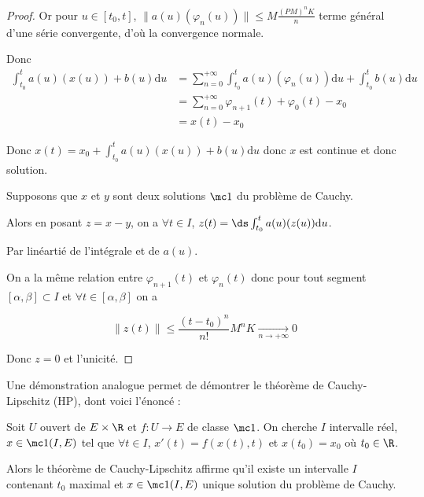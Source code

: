 \begin{proof}
    Or pour $u \in [t_0, t]$, $\| a(u)(\varphi_n(u)) \| \leqslant M \frac{(PM)^nK}{n}$ terme général d'une 
    série convergente, d'où la convergence normale. 

    Donc 
    \begin{align}
        \int_{t_0}^{t} a(u)(x(u)) + b(u) \mathrm d u & = \sum_{n = 0}^{+ \infty} \int_{t_0}^{t} a(u)(\varphi_n(u)) \mathrm d u + \int_{t_0}^{t} b(u) \mathrm d u \\
        & = \sum_{n = 0}^{+ \infty} \varphi_{n + 1}(t) + \varphi_0(t) - x_0 \\
        & = x(t) - x_0
    \end{align}

    Donc $x(t) = x_0 + \int_{t_0}^{t} a(u)(x(u)) + b(u) \mathrm d u$ donc $x$ est continue et donc 
    solution. 


    \lvspace {}

    \svspace Supposons que $x$ et $y$ sont deux solutions $\mc 1$ du problème de Cauchy.

    Alors en posant $z = x - y$, on a $\forall t \in I$, $z(t) = \ds \int_{t_0}^{t} a(u)(z(u)) \mathrm d u$.

    Par linéartié de l'intégrale et de $a(u)$. 

    On a la même relation entre $\varphi_{n + 1}(t)$ et $\varphi_n(t)$ donc pour tout 
    segment $[\alpha, \beta] \subset I$ et 
    $\forall t \in [\alpha, \beta]$ on a 
    
    $$\| z(t) \| \leqslant \frac{(t - t_0)^n}{n!}M^nK \xrightarrow[n \to + \infty]{} 0$$

    Donc $z = 0$ et l'unicité. 
\end{proof}

\begin{remarque}
    Une démonstration analogue permet de démontrer le théorème de Cauchy-Lipschitz (HP), dont voici l'énoncé :

    Soit $U$ ouvert de $E \times \R$ et $f : U \to E$ de classe $\mc 1$. On cherche 
    $I$ intervalle réel, $x \in \mc 1 (I, E)$ tel que $\forall t \in I$, 
    $x'(t) = f(x(t), t)$ et $x(t_0) = x_0$ où $t_0 \in \R$. 

    Alors le théorème de Cauchy-Lipschitz affirme qu'il existe un intervalle $I$ contenant 
    $t_0$ maximal 
    et $x \in \mc 1 (I, E)$ unique solution du problème de Cauchy.
\end{remarque}

